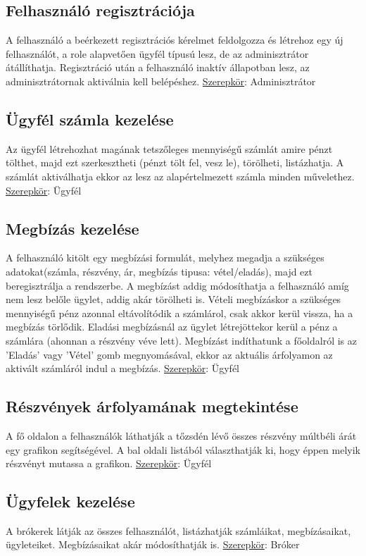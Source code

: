 \subsection{Felhasználó regisztrációja}
A felhasználó a beérkezett regisztrációs kérelmet feldolgozza és létrehoz egy új felhasználót, a role alapvetően ügyfél típusú lesz, de az adminisztrátor átállíthatja. Regisztráció után a felhasználó inaktív állapotban lesz, az adminisztrátornak aktiválnia kell belépéshez.
\newline \underline{Szerepkör}: Adminisztrátor

\subsection{Ügyfél számla kezelése}
Az ügyfél létrehozhat magának tetszőleges mennyiségű számlát amire pénzt tölthet, majd ezt szerkesztheti (pénzt tölt fel, vesz le), törölheti, listázhatja. A számlát aktiválhatja ekkor az lesz az alapértelmezett számla minden művelethez.
\newline \underline{Szerepkör}: Ügyfél

\subsection{Megbízás kezelése}
 A felhasználó kitölt egy megbízási formulát, melyhez megadja a szükséges adatokat(számla, részvény, ár, megbízás tipusa: vétel/eladás), majd ezt beregisztrálja a rendszerbe. A megbízást addig módosíthatja a felhasználó amíg nem lesz belőle ügylet, addig akár törölheti is. Vételi megbízáskor a szükséges mennyiségű pénz azonnal eltávolítódik a számlárol, csak akkor kerül vissza, ha a megbízás törlődik. Eladási megbízásnál az ügylet létrejöttekor kerül a pénz a számlára (ahonnan a részvény véve lett). Megbízást indíthatunk a főoldalról is az 'Eladás' vagy 'Vétel' gomb megnyomásával, ekkor az aktuális árfolyamon az aktivált számláról indul a megbízás.
\newline \underline{Szerepkör}: Ügyfél

\subsection{Részvények árfolyamának megtekintése}
A fő oldalon a felhasználók láthatják a tőzsdén lévő összes részvény múltbéli árát egy grafikon segítségével. A bal oldali listából választhatják ki, hogy éppen melyik részvényt mutassa a grafikon.
\newline \underline{Szerepkör}: Ügyfél

\subsection{Ügyfelek kezelése}
A brókerek látják az összes felhasználót, listázhatják számláikat, megbízásaikat, ügyleteiket. Megbízásaikat akár módosíthatják is.
\newline \underline{Szerepkör}: Bróker
